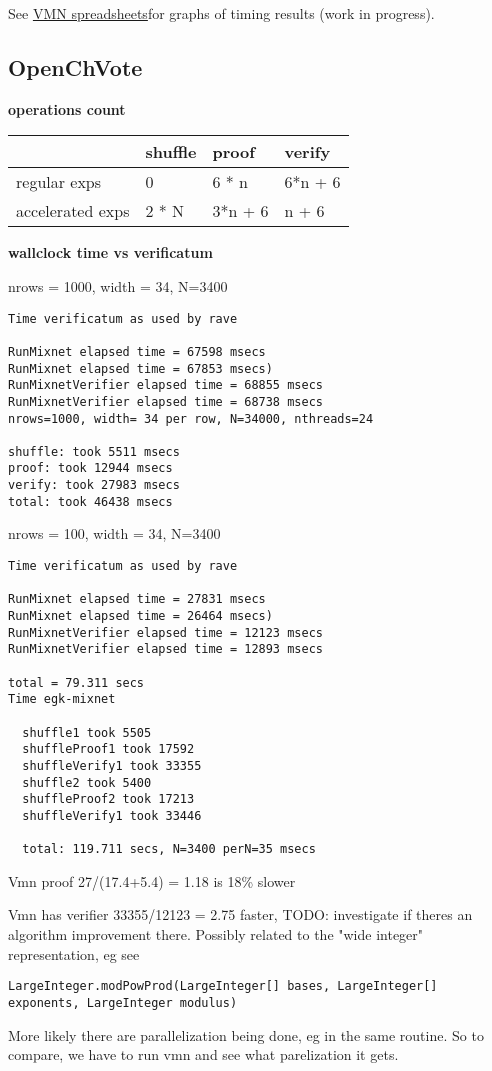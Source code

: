 \documentclass{article}
\begin{document}
See \href{https://docs.google.com/spreadsheets/d/1Sny1xXxU9vjPnqo2K1QPeBHQwPVWhJOHdlXocMimt88/edit?usp=sharing}{VMN spreadsheets}for
graphs of timing results (work in progress).

\subsection*{OpenChVote}

\textbf{operations count}

\begin{longtable}[c]{@{}llll@{}}
\toprule 
 & shuffle  & proof  & verify\tabularnewline
\endhead
\midrule 
regular exps  & 0  & 6 {*} n  & 6{*}n + 6\tabularnewline
accelerated exps  & 2 {*} N  & 3{*}n + 6  & n + 6\tabularnewline
\bottomrule
\end{longtable}

\textbf{wallclock time vs verificatum}

nrows = 1000, width = 34, N=3400
\begin{verbatim}
Time verificatum as used by rave

RunMixnet elapsed time = 67598 msecs
RunMixnet elapsed time = 67853 msecs)
RunMixnetVerifier elapsed time = 68855 msecs
RunMixnetVerifier elapsed time = 68738 msecs
nrows=1000, width= 34 per row, N=34000, nthreads=24

shuffle: took 5511 msecs
proof: took 12944 msecs
verify: took 27983 msecs
total: took 46438 msecs
\end{verbatim}
nrows = 100, width = 34, N=3400
\begin{verbatim}
Time verificatum as used by rave

RunMixnet elapsed time = 27831 msecs
RunMixnet elapsed time = 26464 msecs)
RunMixnetVerifier elapsed time = 12123 msecs
RunMixnetVerifier elapsed time = 12893 msecs

total = 79.311 secs
Time egk-mixnet

  shuffle1 took 5505
  shuffleProof1 took 17592
  shuffleVerify1 took 33355
  shuffle2 took 5400
  shuffleProof2 took 17213
  shuffleVerify1 took 33446
  
  total: 119.711 secs, N=3400 perN=35 msecs
\end{verbatim}
Vmn proof 27/(17.4+5.4) = 1.18 is 18\% slower

Vmn has verifier 33355/12123 = 2.75 faster, TODO: investigate if theres
an algorithm improvement there. Possibly related to the "wide integer"
representation, eg see
\begin{verbatim}
LargeInteger.modPowProd(LargeInteger[] bases, LargeInteger[] exponents, LargeInteger modulus)
\end{verbatim}
More likely there are parallelization being done, eg in the same routine.
So to compare, we have to run vmn and see what parelization it gets.
\end{document}
